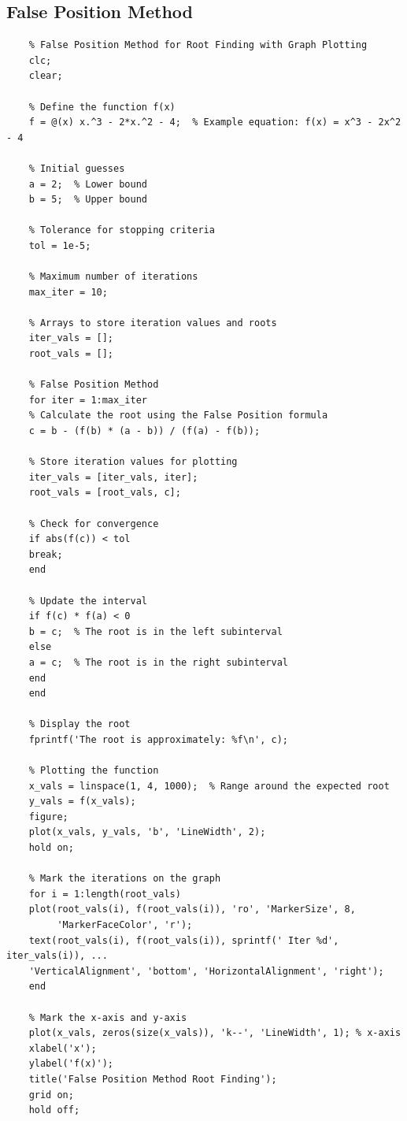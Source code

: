 \documentclass[12pt,a4paper]{article}
\begin{document}
\subsection{False Position Method}
\begin{verbatim}
	% False Position Method for Root Finding with Graph Plotting
	clc;
	clear;
	
	% Define the function f(x)
	f = @(x) x.^3 - 2*x.^2 - 4;  % Example equation: f(x) = x^3 - 2x^2 - 4
	
	% Initial guesses
	a = 2;  % Lower bound
	b = 5;  % Upper bound
	
	% Tolerance for stopping criteria
	tol = 1e-5;
	
	% Maximum number of iterations
	max_iter = 10;
	
	% Arrays to store iteration values and roots
	iter_vals = [];
	root_vals = [];
	
	% False Position Method
	for iter = 1:max_iter
	% Calculate the root using the False Position formula
	c = b - (f(b) * (a - b)) / (f(a) - f(b));
	
	% Store iteration values for plotting
	iter_vals = [iter_vals, iter];
	root_vals = [root_vals, c];
	
	% Check for convergence
	if abs(f(c)) < tol
	break;
	end
	
	% Update the interval
	if f(c) * f(a) < 0
	b = c;  % The root is in the left subinterval
	else
	a = c;  % The root is in the right subinterval
	end
	end
	
	% Display the root
	fprintf('The root is approximately: %f\n', c);
	
	% Plotting the function
	x_vals = linspace(1, 4, 1000);  % Range around the expected root
	y_vals = f(x_vals);
	figure;
	plot(x_vals, y_vals, 'b', 'LineWidth', 2);
	hold on;
	
	% Mark the iterations on the graph
	for i = 1:length(root_vals)
	plot(root_vals(i), f(root_vals(i)), 'ro', 'MarkerSize', 8,
		 'MarkerFaceColor', 'r');
	text(root_vals(i), f(root_vals(i)), sprintf(' Iter %d', iter_vals(i)), ...
	'VerticalAlignment', 'bottom', 'HorizontalAlignment', 'right');
	end
	
	% Mark the x-axis and y-axis
	plot(x_vals, zeros(size(x_vals)), 'k--', 'LineWidth', 1); % x-axis
	xlabel('x');
	ylabel('f(x)');
	title('False Position Method Root Finding');
	grid on;
	hold off;
	
\end{verbatim}
\end{document}

